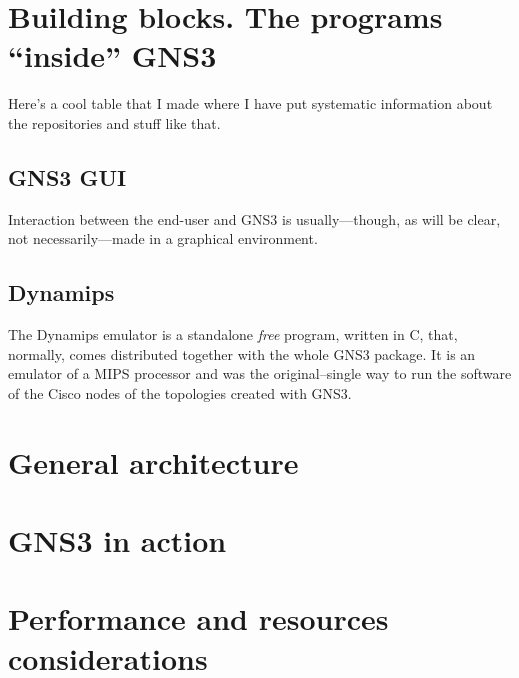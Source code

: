 
\section{Building blocks. The programs ``inside'' GNS3}
\label{sec:gns3buildingblocks}

Here's a cool table that I made where I have put systematic information about the repositories and stuff like that.



\subsection{GNS3 GUI}
\label{subsec:gns3gui}

Interaction between the end-user and GNS3 is usually---though, as will be clear, not necessarily---made in a graphical environment.

\subsection{Dynamips}
\label{subsec:gns3dynamips}

The Dynamips emulator is a standalone \emph{free} program, written in C, that, normally, comes distributed together with the whole GNS3 package.
It is an emulator of a MIPS processor and was the original--single way to run the software of the Cisco nodes of the topologies created with GNS3.


\section{General architecture}
\label{sec:gns3architecture}


\section{GNS3 in action}
\label{sec:gns3inaction}


\section{Performance and resources considerations}
\label{sec:gns3performance}


